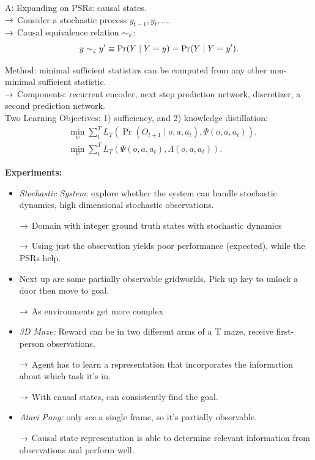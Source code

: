 A: Expanding on PSRs: causal states. \\

$\rightarrow$ Consider a stochastic process $y_{t-1}, y_t, \ldots$. \\

$\rightarrow$ Causal equivalence relation $\sim_\varepsilon$:
\[
y \sim_\varepsilon y' \equiv \Pr(Y \mid Y = y) = \Pr(Y \mid Y = y').
\]

Method: minimal sufficient statistics can be computed from any other non-minimal sufficient statistic. \\

$\rightarrow$ Components: recurrent encoder, next step prediction network, discretizer, a second prediction network. \\

Two Learning Objectives: 1) sufficiency, and 2) knowledge distillation:
\begin{align}
    &\min_w \sum_t^T L_T\left(\Pr(O_{t+1} \mid o, a, a_t), \Psi(o, a, a_t)\right). \\
    &\min_w \sum_t^T L_T\left(\Psi(o, a, a_t), \Lambda(o,a,a_t)\right).
\end{align}

{\bf Experiments:}
\begin{itemize}
    \item {\it Stochastic System}: explore whether the system can handle stochastic dynamics, high dimensional stochastic observations.
    
    $\rightarrow$ Domain with integer ground truth states with stochastic dynamics
    
    $\rightarrow$ Using just the observation yields poor performance (expected), while the PSRs help.
    
    \item Next up are some partially observable gridworlds. Pick up key to unlock a door then move to goal.
    
    $\rightarrow$ As environments get more complex
    
    \item {\it 3D Maze:} Reward can be in two different arms of a T maze, receive first-person observations.
    
    $\rightarrow$ Agent has to learn a representation that incorporates the information about which task it's in.
    
    $\rightarrow$ With causal states, can consistently find the goal.
    
    \item {\it Atari Pong:} only see a single frame, so it's partially observable.
    
    $\rightarrow$ Causal state representation is able to determine relevant information from observations and perform well.
\end{itemize}

